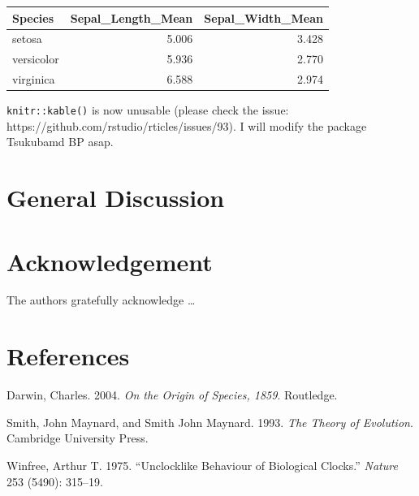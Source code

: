 \documentclass[12pt, a4paper]{report} %
\newlength{\cslhangindent}
\newenvironment{CSLReferences}[2] %
 {%
  \setlength{\parindent}{0pt}
  \ifodd #1 \everypar{\setlength{\hangindent}{\cslhangindent}}\ignorespaces\fi
  \ifnum #2 > 0
  \setlength{\parskip}{#2\baselineskip}
  \fi
 }%
 {}
\begin{document}
\begin{longtable}[]{@{}lrr@{}}
\toprule
Species & Sepal\_Length\_Mean & Sepal\_Width\_Mean \\
\midrule
\endhead
setosa & 5.006 & 3.428 \\
versicolor & 5.936 & 2.770 \\
virginica & 6.588 & 2.974 \\
\bottomrule
\end{longtable}

\texttt{knitr::kable()} is now unusable (please check the issue:
https://github.com/rstudio/rticles/issues/93). I will modify the package
Tsukubamd BP asap.

\chapter*{General Discussion}
\parindent=5.3mm

\chapter*{Acknowledgement}

The authors gratefully acknowledge \ldots{}

\chapter*{References}

\hypertarget{refs}{}
\begin{CSLReferences}{1}{0}
\leavevmode{}%
Darwin, Charles. 2004. \emph{On the Origin of Species, 1859}. Routledge.

\leavevmode{}%
Smith, John Maynard, and Smith John Maynard. 1993. \emph{The Theory of
Evolution}. Cambridge University Press.

\leavevmode{}%
Winfree, Arthur T. 1975. {``Unclocklike Behaviour of Biological
Clocks.''} \emph{Nature} 253 (5490): 315--19.

\end{CSLReferences}



\end{document}
